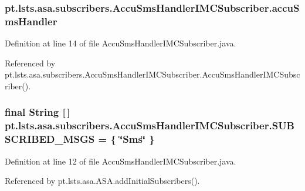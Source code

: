 \subsubsection[{accu\+Sms\+Handler}]{ pt.\+lsts.\+asa.\+subscribers.\+Accu\+Sms\+Handler\+I\+M\+C\+Subscriber.\+accu\+Sms\+Handler\hspace{0.3cm}{\ttfamily [private]}}\label{classpt_1_1lsts_1_1asa_1_1subscribers_1_1AccuSmsHandlerIMCSubscriber_aabfa489d410eab1aeb6f3cb5f74c6316}


Definition at line 14 of file Accu\+Sms\+Handler\+I\+M\+C\+Subscriber.\+java.



Referenced by pt.\+lsts.\+asa.\+subscribers.\+Accu\+Sms\+Handler\+I\+M\+C\+Subscriber.\+Accu\+Sms\+Handler\+I\+M\+C\+Subscriber().

\hypertarget{classpt_1_1lsts_1_1asa_1_1subscribers_1_1AccuSmsHandlerIMCSubscriber_aff3ba7434ed0b051563cca42a6299401}{}
\subsubsection[{S\+U\+B\+S\+C\+R\+I\+B\+E\+D\+\_\+\+M\+S\+G\+S}]{\setlength{\rightskip}{0pt plus 5cm}final String \mbox{[}$\,$\mbox{]} pt.\+lsts.\+asa.\+subscribers.\+Accu\+Sms\+Handler\+I\+M\+C\+Subscriber.\+S\+U\+B\+S\+C\+R\+I\+B\+E\+D\+\_\+\+M\+S\+G\+S = \{ \char`\"{}Sms\char`\"{} \}\hspace{0.3cm}{\ttfamily [static]}}\label{classpt_1_1lsts_1_1asa_1_1subscribers_1_1AccuSmsHandlerIMCSubscriber_aff3ba7434ed0b051563cca42a6299401}


Definition at line 12 of file Accu\+Sms\+Handler\+I\+M\+C\+Subscriber.\+java.



Referenced by pt.\+lsts.\+asa.\+A\+S\+A.\+add\+Initial\+Subscribers().

\hypertarget{classpt_1_1lsts_1_1asa_1_1subscribers_1_1AccuSmsHandlerIMCSubscriber_aa3a344766522e3457edc9f30d57bd508}{}

